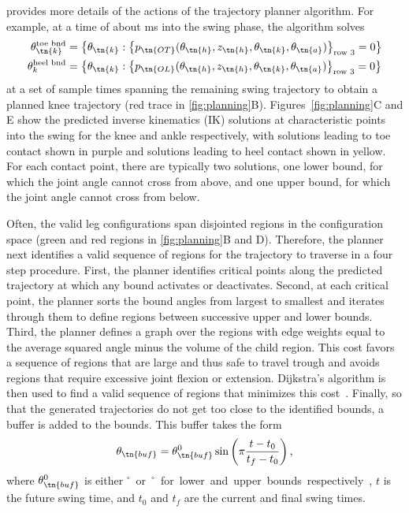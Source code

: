  provides more details of the actions of the trajectory
planner algorithm. For example, at a time of about \unit[150]{ms} into the swing
phase, the algorithm solves
\begin{align}
    \theta_\tn{k}^\textrm{toe bnd} 
        &= \left\{\theta_\tn{k} : \left\{p_\tn{OT}
            (\theta_\tn{h}, z_\tn{h}, \theta_\tn{k}, \theta_\tn{a})
            \right\}_\textrm{row 3} = 0 \right\} \\
    \theta_k^\textrm{heel bnd} 
        &= \left\{\theta_\tn{k} : \left\{p_\tn{OL}
            (\theta_\tn{h}, z_\tn{h}, \theta_\tn{k}, \theta_\tn{a})
            \right\}_\textrm{row 3} = 0 \right\}
\end{align}
at a set of sample times spanning the remaining swing trajectory to obtain a
planned knee trajectory (red trace in \cref{fig:planning}B).
Figures~\cref{fig:planning}C and E show the predicted inverse kinematics (IK)
solutions at characteristic points into the swing for the knee and ankle
respectively, with solutions leading to toe contact shown in purple and
solutions leading to heel contact shown in yellow. For each contact point, there
are typically two solutions, one lower bound, for which the joint angle cannot
cross from above, and one upper bound, for which the joint angle cannot cross
from below. 

Often, the valid leg configurations span disjointed regions in the configuration
space (green and red regions in \cref{fig:planning}B and D). Therefore, the
planner next identifies a valid sequence of regions for the trajectory to
traverse in a four step procedure.  First, the planner identifies critical
points along the predicted trajectory at which any bound activates or
deactivates. Second, at each critical point, the planner sorts the bound angles
from largest to smallest and iterates through them to define regions between
successive upper and lower bounds. Third, the planner defines a graph over the
regions with edge weights equal to the average squared angle minus the volume of
the child region. This cost favors a sequence of regions that are large and thus
safe to travel trough and avoids regions that require excessive joint flexion or
extension. Dijkstra's algorithm is then used to find a valid sequence of regions
that minimizes this cost~\citep{dijkstra1959note}. Finally, so that the
generated trajectories do not get too close to the identified bounds, a buffer
is added to the bounds. This buffer takes the form
\begin{align}
    \theta_\tn{buf} = \theta_\tn{buf}^0 \sin 
        \left(\pi \frac{t - t_0}{t_f - t_0} \right),
\end{align}
where $\theta_\tn{buf}^0$ is either \unit[5]{$^\circ$} or \unit[-5]{$^\circ$}
for lower and upper bounds respectively, $t$ is the future swing time, and $t_0$
and $t_f$ are the current and final swing times.

